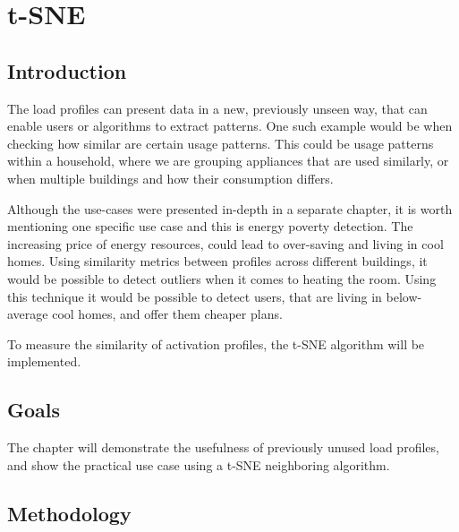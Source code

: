 
\chapter{t-SNE} %

\label{Chapter8} %


\section{Introduction}

The load profiles can present data in a new, previously unseen way, that can enable users or algorithms to extract patterns.
One such example would be when checking how similar are certain usage patterns.
This could be usage patterns within a household, where we are grouping appliances that are used similarly,
or when multiple buildings and how their consumption differs. 

Although the use-cases were presented in-depth in a separate chapter, it is worth mentioning one specific use case and this is energy poverty detection. 
The increasing price of energy resources, could lead to over-saving and living in cool homes.
Using similarity metrics between profiles across different buildings, it would be possible to detect outliers when it comes to heating the room. 
Using this technique it would be possible to detect users, that are living in below-average cool homes, and offer them cheaper plans. 

To measure the similarity of activation profiles, the t-SNE algorithm will be implemented.

\section{Goals}

The chapter will demonstrate the usefulness of previously unused load profiles,
and show the practical use case using a t-SNE neighboring algorithm.

\section{Methodology}

